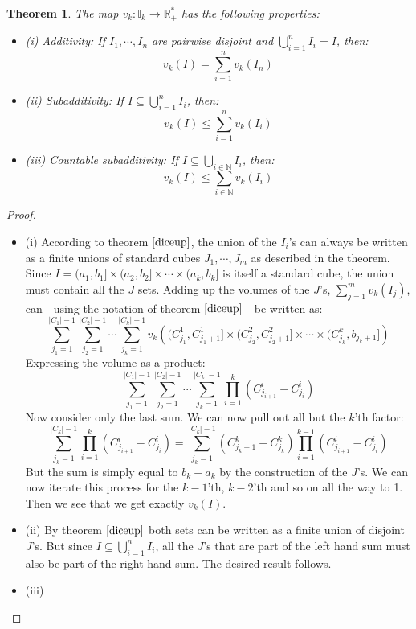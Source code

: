 \documentclass[12pt, a4paper]{article}
\newtheorem{theorem}{Theorem}[section]
\numberwithin{equation}{section}
\begin{document}
\begin{theorem}
The map $v_k: \mathbb{I}_k\rightarrow\mathbb{R}^*_+$ has the following properties:
\begin{itemize}
\item (i) Additivity: If $I_1,\cdots,I_n$ are pairwise disjoint and $\bigcup_{i=1}^n I_i=I$, then:
\begin{equation}
v_k(I)=\sum_{i=1}^n v_k(I_n)
\end{equation}
\item (ii) Subadditivity: If $I\subseteq\bigcup_{i=1}^n I_i$, then:
\begin{equation}
v_k(I)\le\sum_{i=1}^n v_k(I_i)
\end{equation}
\item (iii) Countable subadditivity: If $I\subseteq\bigcup_{i\in\mathbb{N}} I_i$, then:
\begin{equation}
v_k(I)\le\sum_{i\in\mathbb{N}} v_k(I_i)
\end{equation}
\end{itemize}
\end{theorem}
\begin{proof}
\begin{itemize}

\item (i) According to theorem $\ref{diceup}$, the union of the $I_i$'s can always be written as a finite unions of standard cubes $J_1,\cdots,J_m$ as described in the theorem. Since $I=(a_1,b_1]\times(a_2,b_2]\times\cdots\times(a_k,b_k]$ is itself a standard cube, the union must contain all the $J$ sets. Adding up the volumes of the $J$'s, $\sum_{j=1}^m v_k(I_j)$, can - using the notation of theorem $\ref{diceup}$ - be written as:
\begin{equation}
\sum_{j_1=1}^{|C_1|-1}\sum_{j_2=1}^{|C_2|-1}\cdots\sum_{j_k=1}^{|C_k|-1}v_k\left((C^1_{j_1},C^1_{j_1+1}]\times(C^2_{j_2},C^2_{j_2+1}]\times\cdots\times(C^k_{j_k},b_{j_k+1}]\right)
\end{equation}
Expressing the volume as a product:
\begin{equation}
\sum_{j_1=1}^{|C_1|-1}\sum_{j_2=1}^{|C_2|-1}\cdots\sum_{j_k=1}^{|C_k|-1}\prod_{i=1}^k(C^i_{j_{i+1}}-C^i_{j_i})
\end{equation}
Now consider only the last sum. We can now pull out all but the $k$'th factor:
\begin{equation}
\sum_{j_k=1}^{|C_k|-1}\prod_{i=1}^k(C^i_{j_{i+1}}-C^i_{j_i})=\sum_{j_k=1}^{|C_k|-1}(C^k_{j_k+1}-C^k_{j_k})\prod_{i=1}^{k-1}(C^i_{j_{i+1}}-C^i_{j_i})
\end{equation}
But the sum is simply equal to $b_k-a_k$ by the construction of the $J$'s. We can now iterate this process for the $k-1$'th, $k-2$'th and so on all the way to 1. Then we see that we get exactly $v_k(I)$.
\item (ii) By theorem $\ref{diceup}$ both sets can be written as a finite union of disjoint $J$'s. But since $I\subseteq\bigcup_{i=1}^n I_i$, all the $J$'s that are part of the left hand sum must also be part of the right hand sum. The desired result follows.
\item (iii) 
\end{itemize}
\end{proof}
\end{document}
